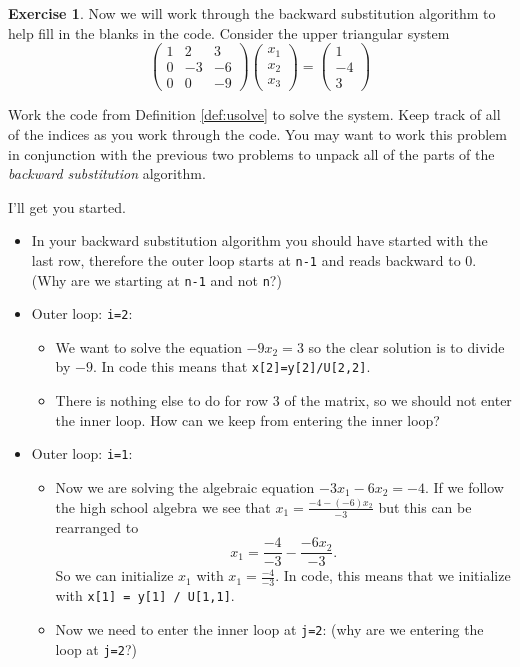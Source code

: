 \documentclass[
]{book}
\providecommand{\tightlist}{%
  \setlength{\itemsep}{0pt}\setlength{\parskip}{0pt}}
\theoremstyle{definition}
\theoremstyle{definition}
\theoremstyle{definition}
\newtheorem{exercise}{Exercise}[chapter]
\theoremstyle{remark}
\begin{document}
\begin{exercise}
\protect\hypertarget{exr:unnamed-chunk-331}{}{\label{exr:unnamed-chunk-331} }Now we will work through the backward substitution algorithm to help fill in the blanks in the code. Consider the upper triangular system
\[ \begin{pmatrix} 1 & 2 & 3 \\ 0 & -3 & -6 \\ 0 & 0 & -9 \end{pmatrix} \begin{pmatrix} x_1 \\ x_2 \\ x_3 \end{pmatrix} = \begin{pmatrix} 1 \\ -4 \\ 3\end{pmatrix} \]

Work the code from Definition \ref{def:usolve} to solve the system. Keep track of all of the indices as you work through the code. You may want to work this problem in conjunction with the previous two problems to unpack all of the parts of the \emph{backward substitution} algorithm.

I'll get you started.

\begin{itemize}
\tightlist
\item
  In your backward substitution algorithm you should have started with the last row, therefore the outer loop starts at \texttt{n-1} and reads backward to 0. (Why are we starting at \texttt{n-1} and not \texttt{n}?)
\item
  Outer loop: \texttt{i=2}:

  \begin{itemize}
  \tightlist
  \item
    We want to solve the equation \(-9x_2 = 3\) so the clear solution is to divide by \(-9\). In code this means that \texttt{x{[}2{]}=y{[}2{]}/U{[}2,2{]}}.\\
  \item
    There is nothing else to do for row 3 of the matrix, so we should not enter the inner loop. How can we keep from entering the inner loop?\\
  \end{itemize}
\item
  Outer loop: \texttt{i=1}:

  \begin{itemize}
  \tightlist
  \item
    Now we are solving the algebraic equation \(-3x_1 - 6x_2 = -4\). If we follow the high school algebra we see that \(x_1 = \frac{-4 - (-6)x_2}{-3}\) but this can be rearranged to
    \[ x_1 = \frac{-4}{-3} - \frac{-6x_2}{-3}. \]
    So we can initialize \(x_1\) with \(x_1 = \frac{-4}{-3}\). In code, this means that we initialize with \texttt{x{[}1{]}\ =\ y{[}1{]}\ /\ U{[}1,1{]}}.
  \item
    Now we need to enter the inner loop at \texttt{j=2}: (why are we entering the loop at \texttt{j=2}?)


\end{itemize}
\end{itemize}
\end{exercise}
\end{document}
